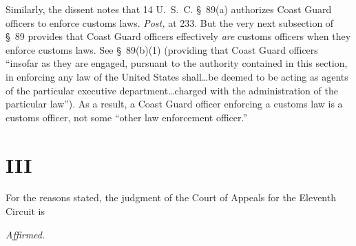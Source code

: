   Similarly, the dissent notes that 14 U.~S.~C. \S~89(a) authorizes Coast Guard officers to enforce customs laws. \emph{Post,} at 233. But the very next subsection of \S~89 provides that Coast Guard officers effectively \emph{are} customs officers when they enforce customs laws. See \S~89(b)(1) (providing that Coast Guard officers ``insofar as they are engaged, pursuant to the authority contained in this section, in enforcing any law of the United States shall\dots be deemed to be acting as agents of the particular executive department\dots charged with the administration of the particular law''). As a result, a Coast Guard officer enforcing a customs law is a customs officer, not some ``other law enforcement officer.''

\section{III}

  For the reasons stated, the judgment of the Court of Appeals for the Eleventh Circuit is

\begin{flushright}
	\emph{Affirmed.}
\end{flushright}

